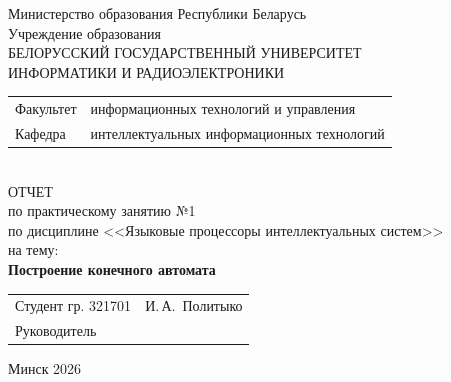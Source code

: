 \begin{titlepage}
	\begin{center}
		Министерство образования Республики Беларусь\\[1em]
		Учреждение образования\\
		БЕЛОРУССКИЙ ГОСУДАРСТВЕННЫЙ УНИВЕРСИТЕТ \\
		ИНФОРМАТИКИ И РАДИОЭЛЕКТРОНИКИ\\[1em]
		
		\begin{minipage}{\textwidth}
			\begin{flushleft}
				\begin{tabular}{ l l }
					Факультет & информационных технологий и управления\\
					Кафедра   & интеллектуальных информационных технологий
				\end{tabular}
			\end{flushleft}
		\end{minipage}\\[1em]
		
		{ОТЧЕТ}\\
		{по практическому занятию №1}\\
		{по дисциплине <<Языковые процессоры интеллектуальных систем>>}\\
		{на тему:}\\[1em]
		\textbf{Построение конечного автомата}\\[1em]
		
		\vspace{2em}
		\begin{tabular}{ p{}p{} }
			Студент гр. 321701 & И.\,А.~Политыко \\
			Руководитель & \underline{\hspace{3.2cm}} \\
		\end{tabular}
		
		\vfill
		{\normalsize Минск 2026}
	\end{center}
\end{titlepage}
